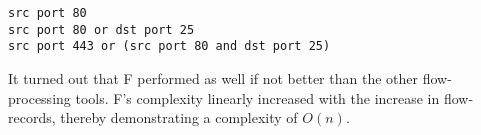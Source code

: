 \begin{lstlisting}
src port 80
src port 80 or dst port 25
src port 443 or (src port 80 and dst port 25)
\end{lstlisting}

It turned out that F performed as well if not better than the other flow-processing tools. F's complexity linearly increased with the increase in flow-records, thereby demonstrating a complexity of $O(n)$.
